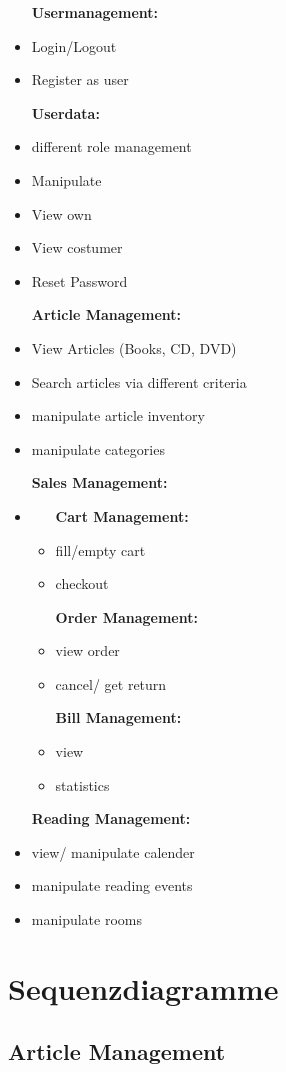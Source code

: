 \documentclass[a4paper]{article}
\begin{document}
\begin{itemize}
	\item[\textbf{Usermanagement:}]
	\item Login/Logout
	\item Register as user
	\item[\textbf{Userdata:}]
	\item different role management
	\item Manipulate
	\item View own
	\item View costumer
	\item Reset Password
	\item[\textbf{Article Management:}]
	\item View Articles (Books, CD, DVD)
	\item Search articles via different criteria
	\item manipulate article inventory
	\item manipulate categories
	\item[\textbf{Sales Management:}]
	\item
	\begin{itemize}
		\item[\textbf{Cart Management:}]
		\item fill/empty cart
		\item checkout
		\item[\textbf{Order Management:}]
		\item view order
		\item cancel/ get return
		\item[\textbf{Bill Management:}]
		\item view
		\item statistics
	\end{itemize}
	\item[\textbf{Reading Management:}]
	\item view/ manipulate calender
	\item manipulate reading events
	\item manipulate rooms
\end{itemize}

\section{Sequenzdiagramme}

\subsection{Article Management}
\end{document}
